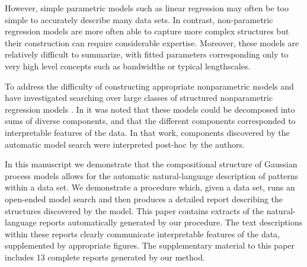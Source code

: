 \documentclass[letterpaper]{article}
\def\ie{i.e.\ }
\def\eg{e.g.\ }
\begin{document}
However, simple parametric models such as linear regression may often be too simple to accurately describe many data sets.
In contrast, non-parametric regression models are more often able to capture more complex structures but their construction can require considerable expertise.
Moreover, these models are relatively difficult to summarize, with fitted parameters corresponding only to very high level concepts such as bandwidths or typical lengthscales.

To address the difficulty of constructing appropriate nonparametric models \citet{diosan2007evolving, bing2010gp, DuvLloGroetal13} and \citet{kronberger2013evolution} have investigated searching over large classes of structured nonparametric regression models .
In \cite{DuvLloGroetal13} it was noted that these models could be decomposed into sums of diverse components, and that the different components corresponded to interpretable features of the data.
In that work, components discovered by the automatic model search were interpreted post-hoc by the authors.

In this manuscript we demonstrate that the compositional structure of Gaussian process models allows for the automatic natural-language description of patterns within a data set.
We demonstrate a procedure which, given a data set, runs an open-ended model search and then produces a detailed report describing the structures discovered by the model. %
%
This paper contains extracts of the natural-language reports automatically generated by our procedure.
The text descriptions within these reports clearly communicate interpretable features of the data, supplemented by appropriate figures.
The supplementary material to this paper includes 13 complete reports generated by our method.
\end{document}
